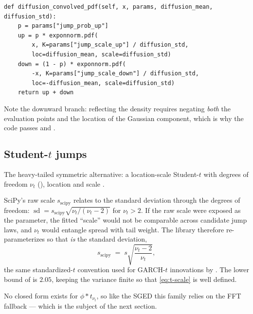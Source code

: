 \begin{lstlisting}[caption={Kou convolution as a mixture of ex-Gaussians in \code{distributions/kou.py}.}]
def diffusion_convolved_pdf(self, x, params, diffusion_mean, diffusion_std):
    p = params["jump_prob_up"]
    up = p * exponnorm.pdf(
        x, K=params["jump_scale_up"] / diffusion_std,
        loc=diffusion_mean, scale=diffusion_std)
    down = (1 - p) * exponnorm.pdf(
        -x, K=params["jump_scale_down"] / diffusion_std,
        loc=-diffusion_mean, scale=diffusion_std)
    return up + down
\end{lstlisting}

Note the downward branch: reflecting the density requires negating
\emph{both} the evaluation points and the location of the Gaussian
component, which is why the code passes  and
.

\subsection{Student-\texorpdfstring{$t$}{t} jumps}
\label{sec:student}

The heavy-tailed symmetric alternative: a location-scale Student-$t$ with
degrees of freedom $\nu_t$ (), location 
and scale .

\begin{decision}
\label{dec:t-scale}
SciPy's raw  scale $s_{\mathrm{scipy}}$ relates to the standard
deviation through the degrees of freedom:
$\operatorname{sd} = s_{\mathrm{scipy}} \sqrt{\nu_t / (\nu_t - 2)}$ for
$\nu_t > 2$. If the raw scale were exposed as the parameter, the fitted
``scale'' would not be comparable across candidate jump laws, and
$\nu_t$ would entangle spread with tail weight. The library therefore
re-parameterizes so that  \emph{is} the standard
deviation,
\begin{equation}
  s_{\mathrm{scipy}} \;=\; s \sqrt{\frac{\nu_t - 2}{\nu_t}},
  \label{eq:t-scale}
\end{equation}
the same standardized-$t$ convention used for GARCH-$t$ innovations by
\citet{Bollerslev1987}. The lower bound of  is $2.05$,
keeping the variance finite so that \eqref{eq:t-scale} is well defined.
\end{decision}

No closed form exists for $\phi * t_{\nu_t}$, so like the SGED this family
relies on the FFT fallback --- which is the subject of the next section.
